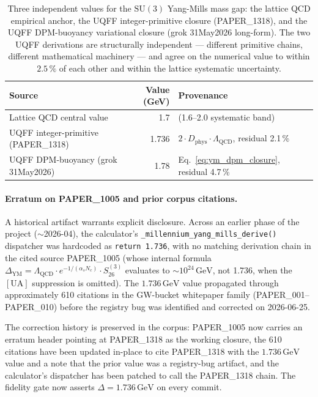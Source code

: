 \begin{table}[H]
\centering
\caption{Three independent values for the $\mathrm{SU}(3)$ Yang-Mills
mass gap: the lattice QCD empirical anchor, the UQFF integer-primitive
closure (PAPER\_1318), and the UQFF DPM-buoyancy variational closure
(grok 31May2026 long-form). The two UQFF derivations are structurally
independent --- different primitive chains, different mathematical
machinery --- and agree on the numerical value to within $2.5\,\%$ of
each other and within the lattice systematic uncertainty.}
\label{tab:ym_three_paths}
\begin{tabular}{l r l}
\toprule
\textbf{Source} & \textbf{Value (GeV)} & \textbf{Provenance} \\
\midrule
Lattice QCD central value & 1.7 & \cite{Chen2006, Athenodorou2020} (1.6--2.0 systematic band) \\
UQFF integer-primitive (PAPER\_1318) & 1.736 & $2\cdot D_{\text{phys}}\cdot\Lambda_{\text{QCD}}$, residual 2.1\,\% \\
UQFF DPM-buoyancy (grok 31May2026) & 1.78 & Eq.~\ref{eq:ym_dpm_closure}, residual 4.7\,\% \\
\bottomrule
\end{tabular}
\end{table}

\paragraph{Erratum on PAPER\_1005 and prior corpus citations.}

A historical artifact warrants explicit disclosure. Across an earlier
phase of the project ($\sim$2026-04), the calculator's
\verb|_millennium_yang_mills_derive()| dispatcher was hardcoded as
\verb|return 1.736|, with no matching derivation chain in the cited
source PAPER\_1005 (whose internal formula
$\Delta_{\text{YM}} = \Lambda_{\text{QCD}}\cdot e^{-1/(\alpha_s N_c)}\cdot S_{26}^{(3)}$
evaluates to $\sim 10^{24}\,\mathrm{GeV}$, not 1.736, when the
$[\mathrm{UA}]$ suppression is omitted). The $1.736\,\mathrm{GeV}$ value
propagated through approximately 610 citations in the GW-bucket
whitepaper family (PAPER\_001--PAPER\_010) before the registry bug was
identified and corrected on 2026-06-25.

The correction history is preserved in the corpus: PAPER\_1005 now
carries an erratum header pointing at PAPER\_1318 as the working
closure, the 610 citations have been updated in-place to cite
PAPER\_1318 with the $1.736\,\mathrm{GeV}$ value and a note that the
prior value was a registry-bug artifact, and the calculator's
dispatcher has been patched to call the PAPER\_1318 chain. The fidelity
gate now asserts $\Delta = 1.736\,\mathrm{GeV}$ on every commit.

